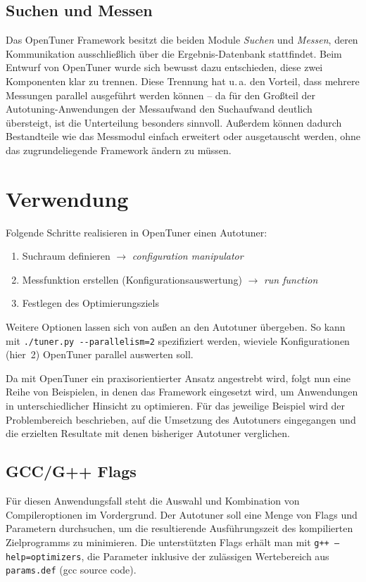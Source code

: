\documentclass[a4paper,11pt]{scrartcl}
\newcommand{\ua}{\mbox{u.\,a.}\xspace}
\begin{document}
\subsection{Suchen und Messen}

Das OpenTuner Framework besitzt die beiden Module \emph{Suchen} und \emph{Messen},
deren Kommunikation ausschließlich über die Ergebnis-Datenbank stattfindet.
Beim Entwurf von OpenTuner wurde sich bewusst dazu entschieden, diese zwei Komponenten
klar zu trennen. Diese Trennung hat \ua den Vorteil, dass mehrere Messungen parallel 
ausgeführt werden können -- da für den Großteil der Autotuning-Anwendungen der Messaufwand
den Suchaufwand deutlich übersteigt, ist die Unterteilung besonders sinnvoll.
Außerdem können dadurch Bestandteile wie das Messmodul einfach erweitert oder 
ausgetauscht werden, ohne das zugrundeliegende Framework ändern zu müssen.



\section{Verwendung}
\label{Verwendung}
Folgende Schritte realisieren in OpenTuner einen Autotuner: 
\begin{enumerate}
  \item Suchraum definieren $\rightarrow$ \emph{configuration manipulator}
  \item Messfunktion erstellen (Konfigurationsauswertung) $\rightarrow$ \emph{run function}
  \item Festlegen des Optimierungsziels
\end{enumerate}
Weitere Optionen lassen sich von außen an den Autotuner übergeben. So kann 
mit \texttt{./tuner.py -{}-parallelism=2} spezifiziert werden, wieviele Konfigurationen
(hier~2) OpenTuner parallel auswerten soll. \newline

Da mit OpenTuner ein praxisorientierter Ansatz angestrebt wird, folgt nun eine Reihe von
Beispielen, in denen das Framework eingesetzt wird, um Anwendungen in unterschiedlicher 
Hinsicht zu optimieren. Für das jeweilige Beispiel wird der Problembereich beschrieben,
auf die Umsetzung des Autotuners eingegangen und die erzielten Resultate mit denen bisheriger
Autotuner verglichen.

\subsection{GCC/G++ Flags}
Für diesen Anwendungsfall steht die Auswahl und Kombination von Compileroptionen
im Vordergrund. Der Autotuner soll eine Menge von Flags und Parametern durchsuchen,
um die resultierende Ausführungszeit des kompilierten Zielprogramms zu minimieren.
Die unterstützten Flags erhält man mit \texttt{g++ --help=optimizers}, die 
Parameter inklusive der zulässigen Wertebereich aus \texttt{params.def} (gcc source code). \newline
\end{document}

